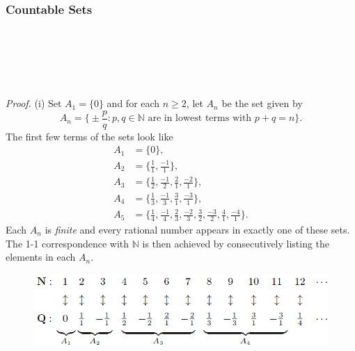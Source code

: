 \documentclass{article}
\begin{document}
        \subsubsection{Countable Sets}
            \\ \\ \\
            \\ \\
            \textit{Proof.} (i) Set $A_1 = \{0\}$ and for each $n \geq 2$, let $A_n$ be the set given by
            \begin{equation*}
                A_n = \bigg\{\pm\frac{p}{q}:p,q \in \mathbb{N} \text{ are in lowest terms with } p+q=n\bigg\}.
            \end{equation*}
            The first few terms of the sets look like
            \begin{align*}
                A_1 & = \{0\}, \\ 
                A_2 & =\bigg\{\frac{1}{1},\frac{-1}{1}\bigg\}, \\
                A_3 & = \bigg\{\frac{1}{2},\frac{-1}{2},\frac{2}{1},\frac{-2}{1}\bigg\}, \\
                A_4 & = \bigg\{\frac{1}{3},\frac{-1}{3},\frac{3}{1},\frac{-3}{1}\bigg\}, \\
                A_5 & = \bigg\{\frac{1}{4},\frac{-1}{4},\frac{2}{3},\frac{-2}{3},\frac{3}{2},\frac{-3}{2},\frac{4}{1},\frac{-4}{1}\bigg\}.
            \end{align*}
            Each $A_n$ is \textit{finite} and every rational number appears in exactly one of these sets. The 1-1 correspondence with $\mathbb{N}$ is then achieved by consecutively listing the elements in each $A_n$.
            \begin{figure}[ht!]
                \centering
                \includegraphics[width=0.8\linewidth]{figs/theorem1.5.6.png}
            \end{figure}\\
\end{document}
